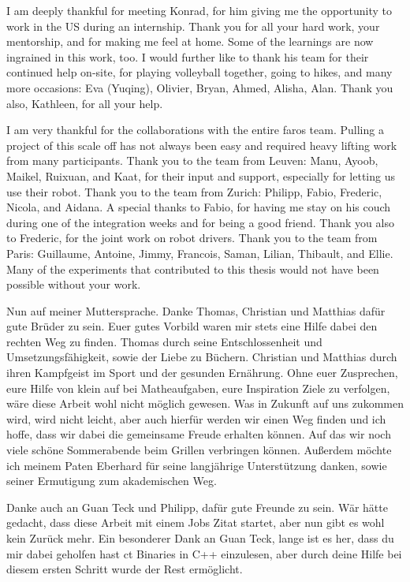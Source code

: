 I am deeply thankful for meeting Konrad, for him giving me the opportunity to work in the US during an internship. Thank you for all your hard work, your mentorship, and for making me feel at home. Some of the learnings are now ingrained in this work, too. I would further like to thank his team for their continued help on-site, for playing volleyball together, going to hikes, and many more occasions: Eva (Yuqing), Olivier, Bryan, Ahmed, Alisha, Alan. Thank you also, Kathleen, for all your help.

I am very thankful for the collaborations with the entire \gls{faros} team. Pulling a project of this scale off has not always been easy and required heavy lifting work from many participants. Thank you to the team from Leuven: Manu, Ayoob, Maikel, Ruixuan, and Kaat, for their input and support, especially for letting us use their robot. Thank you to the team from Zurich: Philipp, Fabio, Frederic, Nicola, and Aidana. A special thanks to Fabio, for having me stay on his couch during one of the integration weeks and for being a good friend. Thank you also to Frederic, for the joint work on robot drivers. Thank you to the team from Paris: Guillaume, Antoine, Jimmy, Francois, Saman, Lilian, Thibault, and Ellie. Many of the experiments that contributed to this thesis would not have been possible without your work.

Nun auf meiner Muttersprache. Danke Thomas, Christian und Matthias dafür gute Brüder zu sein. Euer gutes Vorbild waren mir stets eine Hilfe dabei den rechten Weg zu finden. Thomas durch seine Entschlossenheit und Umsetzungsfähigkeit, sowie der Liebe zu Büchern. Christian und Matthias durch ihren Kampfgeist im Sport und der gesunden Ernährung. Ohne euer Zusprechen, eure Hilfe von klein auf bei Matheaufgaben, eure Inspiration Ziele zu verfolgen, wäre diese Arbeit wohl nicht möglich gewesen. Was in Zukunft auf uns zukommen wird, wird nicht leicht, aber auch hierfür werden wir einen Weg finden und ich hoffe, dass wir dabei die gemeinsame Freude erhalten können. Auf das wir noch viele schöne Sommerabende beim Grillen verbringen können. Außerdem möchte ich meinem Paten Eberhard für seine langjährige Unterstützung danken, sowie seiner Ermutigung zum akademischen Weg.

Danke auch an Guan Teck und Philipp, dafür gute Freunde zu sein. Wär hätte gedacht, dass diese Arbeit mit einem Jobs Zitat startet, aber nun gibt es wohl kein Zurück mehr. Ein besonderer Dank an Guan Teck, lange ist es her, dass du mir dabei geholfen hast \gls{ct} Binaries in C++ einzulesen, aber durch deine Hilfe bei diesem ersten Schritt wurde der Rest ermöglicht.  

